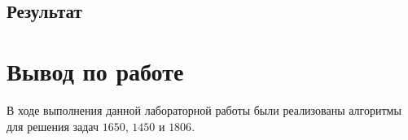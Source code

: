 \documentclass[a5paper, 10pt]{article}
\theoremstyle{definition}
\theoremstyle{plain}
\theoremstyle{remark}
\begin{document}
\subsection{Результат}



\newpage
\section{Вывод по работе}
В ходе выполнения данной лабораторной работы были реализованы алгоритмы для решения задач $1650$, $1450$ и $1806$. 
\end{document}
